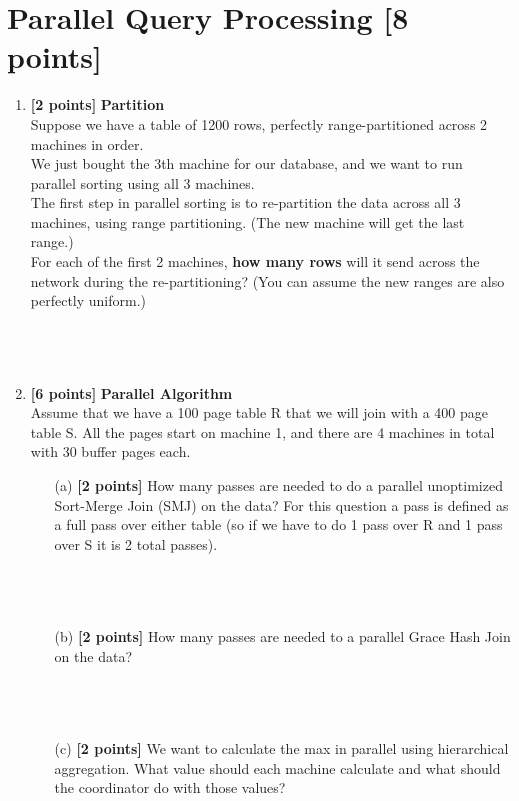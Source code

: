 \documentclass[10pt]{article}
\begin{document}
\section{Parallel Query Processing \textbf{[8 points]}}
\begin{enumerate}
    \item \textbf{[2 points]} \textbf{Partition} \\
          Suppose we have a table of 1200 rows, perfectly range-partitioned across 2 machines in order.\\
          We just bought the 3th machine for our database, and we want to run parallel sorting using all 3 machines.\\
          The first step in parallel sorting is to re-partition the data across all 3 machines, using range partitioning. (The new machine will get the last range.)\\
          For each of the first 2 machines, \textbf{how many rows} will it send across the network during the re-partitioning?
          (You can assume the new ranges are also perfectly uniform.) \\ \\ \\ \\
    \item \textbf{[6 points]} \textbf{Parallel Algorithm} \\
          Assume that we have a 100 page table R that we will join with a 400 page table S.
          All the pages start on machine 1, and there are 4 machines in total with 30 buffer pages each.
          \begin{itemize}
              \item[(a)] \textbf{[2 points]} How many passes are needed to do a parallel unoptimized Sort-Merge Join (SMJ) on the data? For
                  this question a pass is defined as a full pass over either table (so if we have to do 1 pass over R and 1 pass
                  over S it is 2 total passes). \\ \\ \\ \\
              \item[(b)] \textbf{[2 points]} How many passes are needed to a parallel Grace Hash Join on the data? \\ \\ \\ \\
              \item[(c)] \textbf{[2 points]} We want to calculate the max in parallel using hierarchical aggregation. What value should
                  each machine calculate and what should the coordinator do with those values? \\ \\ \\ \\
          \end{itemize}
\end{enumerate}
\end{document}
